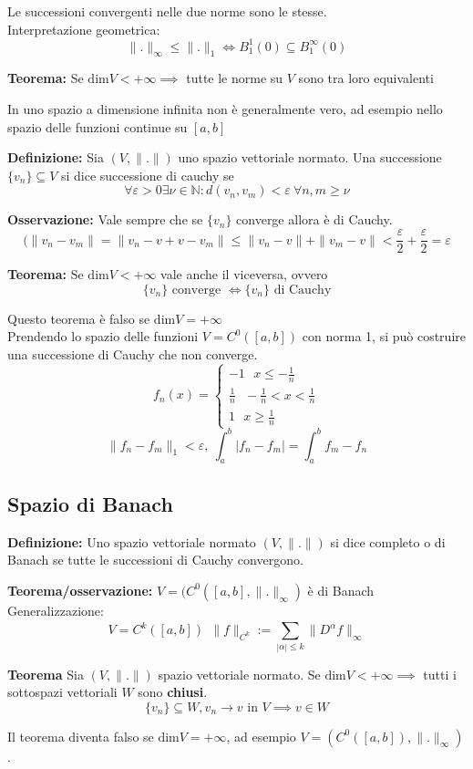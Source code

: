 \documentclass[a4paper]{article}
\newcommand{\N}{\mathbb{N}}
\begin{document}
Le successioni convergenti nelle due norme sono le stesse.
\\Interpretazione geometrica:
\[\|.\|_\infty\le \|.\|_1\iff B_1^1(0)\subseteq  B_1^\infty(0)\]
\begin{tcolorbox}
	\textbf{Teorema:} Se $\text{dim}V<+\infty\implies$ tutte le norme su $V$ sono tra loro equivalenti
\end{tcolorbox}
In uno spazio a dimensione infinita non è generalmente vero, ad esempio nello spazio delle funzioni continue su $[a,b]$
\begin{tcolorbox}
	\textbf{Definizione:} Sia $(V,\|.\|)$ uno spazio vettoriale normato. Una successione $\{v_n\} \subseteq V$ si dice successione di cauchy se 
	\[\forall \varepsilon>0 \exists \nu\in\N:d(v_n,v_m)<\varepsilon\ \forall n,m\ge \nu\]
\end{tcolorbox}
\textbf{Osservazione:} Vale sempre che se $\{v_n\} $ converge allora è di Cauchy.
\[(\|v_n-v_m\|=\|v_n-v+v-v_m\|\le \|v_n-v\|+\|v_m-v\|<\frac{\varepsilon}{2}+\frac{\varepsilon}{2}=\varepsilon\]
\begin{tcolorbox}
	\textbf{Teorema:} Se $\text{dim}V<+\infty$ vale anche il viceversa, ovvero
	\[\{v_n\} \text{ converge }\iff \{v_n\} \text{ di Cauchy}\]
\end{tcolorbox}
Questo teorema è falso se $\text{dim}V=+\infty$
\\Prendendo lo spazio delle funzioni $V=C^0([a,b])$ con norma 1, si può costruire una successione di Cauchy che non converge.
\[f_n(x)=\begin{cases}
	-1\ \ \ x\le -\frac{1}{n}
	\\\frac{1}{n}\ \ \ -\frac{1}{n}<x<\frac{1}{n}
	\\1\ \ \ x\ge \frac{1}{n}
\end{cases}
\]
\[\|f_n-f_m\|_1<\varepsilon,\ \int_{a}^{b} |f_n-f_m|=\int_{a}^{b} f_m-f_n\]
\subsection{Spazio di Banach}
\begin{tcolorbox}
	\textbf{Definizione:} Uno spazio vettoriale normato $(V,\|.\|)$ si dice completo o di Banach se tutte le successioni di Cauchy convergono.
\end{tcolorbox}
\textbf{Teorema/osservazione: }$V=(C^0([a,b],\|.\|_\infty)$ è di Banach
\\Generalizzazione:
\[V=C^k([a,b])\ \ \|f\|_{C^k}:=\sum_{|\alpha|\le k}^{} \|D^\alpha f\|_\infty\]
\begin{tcolorbox}
	\textbf{Teorema} Sia $(V,\|.\|)$ spazio vettoriale normato. Se $\text{dim}V<+\infty\implies$ tutti i sottospazi vettoriali $W$ sono \textbf{chiusi}.
	\[\{v_n\} \subseteq  W,v_n\to v\text{ in }V\implies v\in W\]
\end{tcolorbox}
Il teorema diventa falso se $\text{dim}V=+\infty$, ad esempio $V=(C^0([a,b]), \|.\|_\infty)$.
\end{document}
